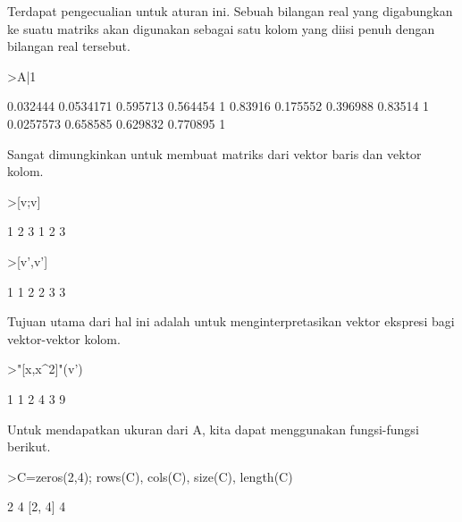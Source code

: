 \documentclass{article}
\newenvironment{eulernotebook}{\par}{\par}
\newenvironment{eulercomment}{\par\medskip}{\par\medskip}
\begin{document}
\begin{eulernotebook}
\begin{eulercomment}
\begin{eulercomment}
\begin{eulercomment}
\begin{eulercomment}
\begin{eulercomment}
\begin{eulercomment}
\begin{eulercomment}
Terdapat pengecualian untuk aturan ini. Sebuah bilangan real yang
digabungkan ke suatu matriks akan digunakan sebagai satu kolom yang
diisi penuh dengan bilangan real tersebut.
\end{eulercomment}
\begin{eulerprompt}
>A|1
\end{eulerprompt}
\begin{euleroutput}
       0.032444     0.0534171      0.595713      0.564454             1 
        0.83916      0.175552      0.396988       0.83514             1 
      0.0257573      0.658585      0.629832      0.770895             1 
\end{euleroutput}
\begin{eulercomment}
Sangat dimungkinkan untuk membuat matriks dari vektor baris dan vektor
kolom.
\end{eulercomment}
\begin{eulerprompt}
>[v;v]
\end{eulerprompt}
\begin{euleroutput}
              1             2             3 
              1             2             3 
\end{euleroutput}
\begin{eulerprompt}
>[v',v']
\end{eulerprompt}
\begin{euleroutput}
              1             1 
              2             2 
              3             3 
\end{euleroutput}
\begin{eulercomment}
Tujuan utama dari hal ini adalah untuk menginterpretasikan vektor
ekspresi bagi vektor-vektor kolom.
\end{eulercomment}
\begin{eulerprompt}
>"[x,x^2]"(v')
\end{eulerprompt}
\begin{euleroutput}
              1             1 
              2             4 
              3             9 
\end{euleroutput}
\begin{eulercomment}
Untuk mendapatkan ukuran dari A, kita dapat menggunakan fungsi-fungsi
berikut.
\end{eulercomment}
\begin{eulerprompt}
>C=zeros(2,4); rows(C), cols(C), size(C), length(C)
\end{eulerprompt}
\begin{euleroutput}
  2
  4
  [2,  4]
  4
\end{euleroutput}

\end{eulercomment}
\end{eulercomment}
\end{eulercomment}
\end{eulercomment}
\end{eulercomment}
\end{eulercomment}
\end{eulernotebook}
\end{document}
